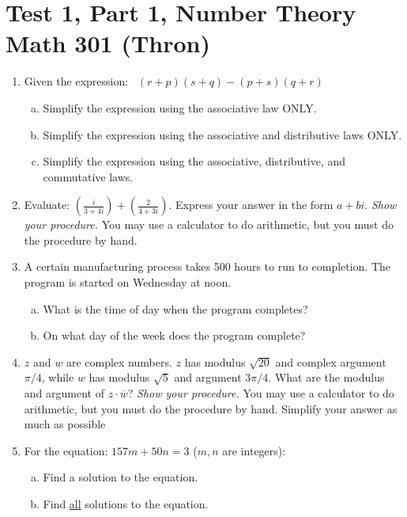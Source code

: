 \chapter{Test 1, Part 1, Number Theory Math 301 (Thron) }\label{Actual}

\begin{enumerate}[(1)]

\item
Given the expression:~
 $(r+p)(s+q) - (p+s)(q+r)$
\begin{enumerate}[(a)]
\item
Simplify the expression using the associative law ONLY.
\item
Simplify the expression using the associative and distributive laws ONLY.
\item
Simplify the expression using the associative, distributive, and commutative laws.
\end{enumerate}

\item
Evaluate:  $\displaystyle{ \left(\frac{i}{3 + 4i} \right) +  \left(\frac{2}{4 + 3i} \right)} $. Express your answer in the form $a + bi$.
\emph{Show your procedure.}  You may use a calculator to do arithmetic, but you must do the procedure by hand.
\item
A certain manufacturing process takes 500 hours to run to completion. The program is started on Wednesday at noon.
\begin{enumerate}[(a)]
\item
What is the time of day when the program completes?
\item
On what day of the week does the program complete?
\end{enumerate}

\item
$z$ and $w$ are complex numbers. $z$ has modulus $\sqrt{20}$ and complex argument $\pi/4$, while $w$ has modulus $\sqrt{5}$ and argument $3\pi/4$.  What are the modulus and argument of $\displaystyle{z \cdot \overline{w}}$? \emph{Show your procedure.}  You may use a calculator to do arithmetic, but you must do the procedure by hand. Simplify your answer as much as possible

\item 
For the equation:  $157m + 50n = 3 $ ($m,n$ are integers):
\begin{enumerate}[(a)]
\item
Find a solution to the equation.
\item
Find \underline{all} solutions to the equation.
\end{enumerate}



\end{enumerate}
